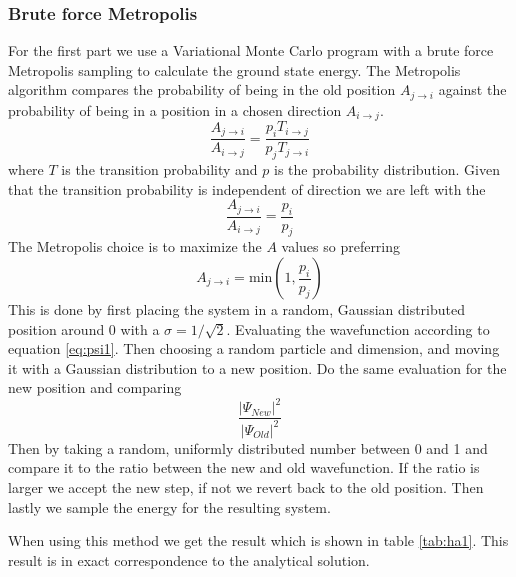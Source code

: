 \documentclass[12pt]{article}
\begin{document}
  \subsubsection{Brute force Metropolis}
  For the first part we use a Variational Monte Carlo program with a brute force Metropolis
  sampling to calculate the ground state energy. The Metropolis algorithm compares the 
  probability of being in the old position $A_{j\rightarrow i}$ against the probability
  of being in a position in a chosen direction $A_{i\rightarrow j}$.
  \begin{equation}
    \frac{A_{j\rightarrow i}}{A_{i\rightarrow j}} = %
    \frac{p_i T_{i\rightarrow j}}{p_j T_{j\rightarrow i}}
  \end{equation}
  where $T$ is the transition probability and $p$ is the probability distribution.
  Given that the transition probability is independent of direction we are left with the
  \begin{equation}
    \frac{A_{j\rightarrow i}}{A_{i\rightarrow j}} = %
    \frac{p_i}{p_j}
  \end{equation}
  The Metropolis choice is to maximize the $A$ values so preferring
  \begin{equation}
    A_{j\rightarrow i} = \text{min}\left(1,\frac{p_i}{p_j}\right)
  \end{equation}
  This is done by first placing the system in a random, Gaussian distributed position 
  around 0 with a $\sigma = 1/\sqrt{2}$. Evaluating the wavefunction according to 
  equation \ref{eq:psi1}. Then choosing a random particle and dimension, and moving 
  it with a Gaussian distribution to a new position. Do the same evaluation for the 
  new position and comparing
  \[\frac{|\Psi_{New}|^2}{|\Psi_{Old}|^2}\]
  Then by taking a random, uniformly distributed number between 0 and 1 and compare it
  to the ratio between the new and old wavefunction. If the ratio is larger we accept
  the new step, if not we revert back to the old position. Then lastly we sample the energy for
  the resulting system.
  
  When using this method we get the result which is shown in table \ref{tab:ha1}. This result is
  in exact correspondence to the analytical solution.
\end{document}
